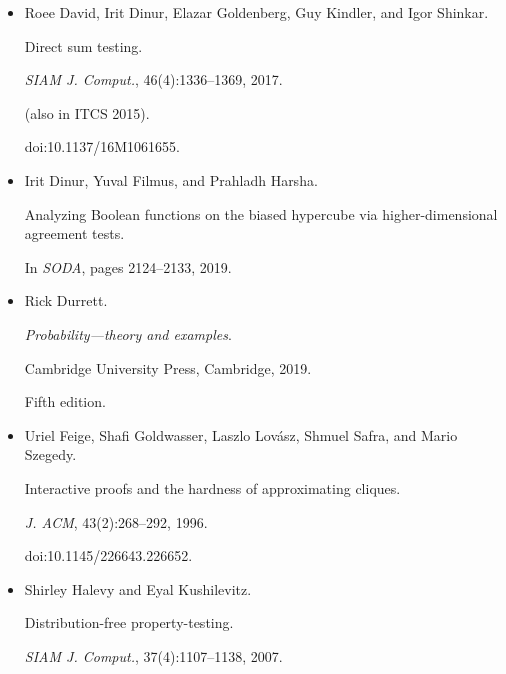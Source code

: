 \documentclass[10pt,a4paper]{article}
\begin{document}
\begin{itemize}
(also in STOC 1990).


doi:10.1016/0022-0000(93)90044-W.





\item[] 
[16]

Roee David, Irit Dinur, Elazar Goldenberg, Guy Kindler, and Igor Shinkar.


Direct sum testing.


\emph{SIAM J. Comput.}, 46(4):1336–1369, 2017.


(also in ITCS 2015).


doi:10.1137/16M1061655.





\item[] 
[17]

Irit Dinur, Yuval Filmus, and Prahladh Harsha.


Analyzing Boolean functions on the biased hypercube via
higher-dimensional agreement tests.


In \emph{SODA}, pages 2124–2133, 2019.





\item[] 
[18]

Rick Durrett.


\emph{Probability—theory and examples}.


Cambridge University Press, Cambridge, 2019.


Fifth edition.





\item[] 
[19]

Uriel Feige, Shafi Goldwasser, Laszlo Lovász, Shmuel Safra, and Mario
Szegedy.


Interactive proofs and the hardness of approximating cliques.


\emph{J. ACM}, 43(2):268–292, 1996.


doi:10.1145/226643.226652.





\item[] 
[20]

Shirley Halevy and Eyal Kushilevitz.


Distribution-free property-testing.


\emph{SIAM J. Comput.}, 37(4):1107–1138, 2007.



\end{itemize}
\end{document}
